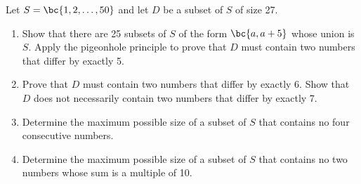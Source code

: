\begin{problem}
    Let $S = \bc{1, 2, \dots, 50}$ and let $D$ be a subset of $S$ of size 27.

    \begin{enumerate}
        \item Show that there are 25 subsets of $S$ of the form $\bc{a, a+5}$ whose union is $S$. Apply the pigeonhole principle to prove that $D$ must contain two numbers that differ by exactly 5.
        \item Prove that $D$ must contain two numbers that differ by exactly 6. Show that $D$ does not necessarily contain two numbers that differ by exactly 7.
        \item Determine the maximum possible size of a subset of $S$ that contains no four consecutive numbers.
        \item Determine the maximum possible size of a subset of $S$ that contains no two numbers whose sum is a multiple of 10.
    \end{enumerate}
\end{problem}
